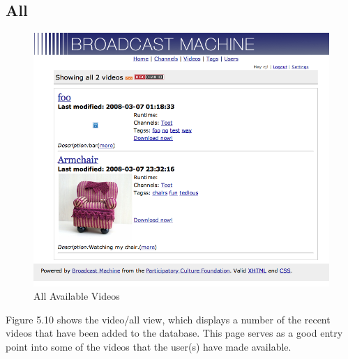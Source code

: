 \documentclass[a4paper,12pt]{report}
\begin{document}
\subsection{All}
\begin{figure}[htp]
\begin{center}
\includegraphics[width=150mm]{./images/videoall.png}
\end{center}
\caption{All Available Videos}
\end{figure}

Figure 5.10 shows the video/all view, which displays a number of the recent videos that have been added to the database.
This page serves as a good entry point into some of the videos that the user(s) have made available.
\end{document}

